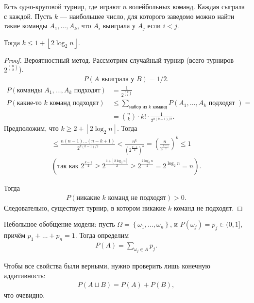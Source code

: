 \begin{thm}
 Есть одно-круговой турнир, где играют $n$ волейбольных команд. Каждая сыграла с каждой. Пусть $k$ --- наибольшее число, для которого заведомо можно найти такие команды  $A_1, \ldots, A_k$, что $A_i$ выиграла у $A_j$ если $i < j$.

 Тогда $k \leqslant 1 + \left\lfloor 2 \log_2 n  \right\rfloor$.
\end{thm}
\begin{proof}
 Вероятностный метод. Рассмотрим случайный турнир (всего турниров $2^{\binom n 2}$).
 \begin{align*}
  P(A \text{ выиграла у } B) = 1 / 2
 .\end{align*} 
 \begin{align*}
  P(\text{команды } A_1, \ldots, A_k \text{ подходят}) &= \frac{1}{2^{\binom k 2}} \\
  P(\text{какие-то $k$ команд подходят}) &\leqslant \sum_{\text{набор из $k$ команд}} P(A_1, \ldots, A_k \text{ подходят }) = \\
  &= \binom n k \cdot k!  \cdot \frac{1}{2^{k(k-1) / 2}}
.\end{align*} Предположим, что $k \geqslant 2 + \left\lfloor 2 \log_2 n \right\rfloor $. Тогда 
 \begin{align*}
  \leqslant \frac{n (n-1) \ldots (n-k+1)}{2^{k(k-1) / 2}} < \frac{n^{k}}{\left(2^{\frac{k-1}{2}}\right)^{k}} = \left(\frac{n}{2^{\frac{k-1}{2}}}\right)^{k} \le 1	
	\\ 	(\text{так как } 2^{\frac{k - 1}{2}} \ge 2^{\frac{1 + \left\lfloor 2 \log_2 n \right\rfloor}{2}} \ge 2^{\frac{2 \log_2 n}{2}} = 2^{\log_2 n} = n) 
 .\end{align*} 
	
 Тогда
 \begin{align*}
  P(\text{никакие $k$ команд не подходят}) > 0
 .\end{align*} Следовательно, существует турнир, в котором никакие $k$ команд не подходят.
\end{proof}

\begin{df*}
 
Небольшое обобщение модели: пусть $\Omega = \left\{ \omega_1, \ldots, \omega_n \right\}$, и $P(\omega_j) = p_j \in (0,1]$, причём $p_1 + \ldots + p_n = 1$. Тогда определим
\begin{align*}
 P(A) = \sum_{\omega_j \in A} p_j
.\end{align*}
\end{df*}

Чтобы все свойства были верными, нужно проверить лишь конечную аддитивность:
\begin{align*}
 P(A \sqcup B) = P(A) + P(B)
,\end{align*} что очевидно.
